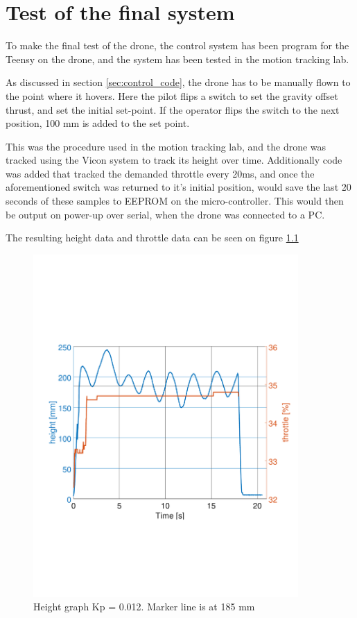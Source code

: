 \chapter{Test of the final system}\label{ap:final_test_report}

To make the final test of the drone, the control system has been program for the Teensy on the drone, and the  system has been tested in the motion tracking lab.

As discussed in section \ref{sec:control_code}, the drone has to be manually flown to the point where it hovers. Here the pilot flips a switch to set the gravity offset thrust, and set the initial set-point. If the operator flips the switch to the next position, 100 mm is added to the set point.

This was the procedure used in the motion tracking lab, and the drone was tracked using the Vicon system to track its height over time. Additionally code was added that tracked the demanded throttle every 20ms, and once the aforementioned switch was returned to it's initial position, would save the last 20 seconds of these samples to EEPROM on the micro-controller. This would then be output on power-up over serial, when the drone was connected to a PC.

The resulting height data and throttle data can be seen on figure \ref{fig:first_test}

\begin{figure}[H]
    \centering
    \includegraphics[width=0.9\textwidth, trim={0 7cm 0 7cm},clip]{figures/Appendix/final_test/kp0,012.pdf}
    \caption{Height graph Kp = 0.012. Marker line is at 185 mm}
    \label{fig:first_test}
\end{figure}

